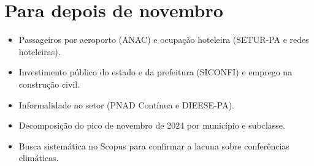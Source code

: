 \section*{Para depois de novembro}
\begin{itemize}
  \item Passageiros por aeroporto (ANAC) e ocupação hoteleira (SETUR-PA e redes hoteleiras).
  \item Investimento público do estado e da prefeitura (SICONFI) e emprego na construção civil.
  \item Informalidade no setor (PNAD Contínua e DIEESE-PA).
  \item Decomposição do pico de novembro de 2024 por município e subclasse.
  \item Busca sistemática no Scopus para confirmar a lacuna sobre conferências climáticas.
\end{itemize}
